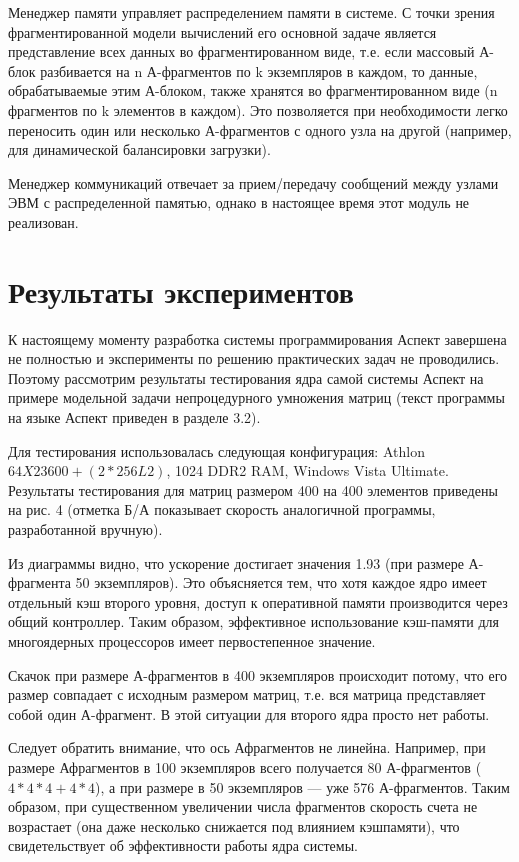 \documentclass[a4paper,11pt,draft]{article} %
\begin{document}
	Менеджер памяти управляет распределением памяти в системе. С точки зрения фрагментированной модели вычислений его основной задаче является представление всех данных во фрагментированном виде, т.е. если массовый А-блок разбивается на n А-фрагментов по k экземпляров
	в каждом, то данные, обрабатываемые этим А-блоком, также хранятся во фрагментированном
	виде (n фрагментов по k элементов в каждом). Это позволяется при необходимости легко переносить один или несколько А-фрагментов с одного узла на другой (например, для динамической
	балансировки загрузки).
	
	Менеджер коммуникаций отвечает за прием/передачу сообщений между узлами ЭВМ с распределенной памятью, однако в настоящее время этот модуль не реализован.
	
	\section{Результаты экспериментов}
	К настоящему моменту разработка системы программирования Аспект завершена не полностью
	и эксперименты по решению практических задач не проводились. Поэтому рассмотрим результаты тестирования ядра самой системы Аспект на примере модельной задачи непроцедурного
	умножения матриц (текст программы на языке Аспект приведен в разделе 3.2).
	
	Для тестирования использовалась следующая конфигурация: Athlon $64 X2 3600+ (2*256 L2)$,
	1024 DDR2 RAM, Windows Vista Ultimate. Результаты тестирования для матриц размером 400 на
	400 элементов приведены на рис. 4 (отметка Б/А показывает скорость аналогичной программы,
	разработанной вручную).
	
	Из диаграммы видно, что ускорение достигает значения 1.93 (при размере А-фрагмента 50
	экземпляров). Это объясняется тем, что хотя каждое ядро имеет отдельный кэш второго уровня,
	доступ к оперативной памяти производится через общий контроллер. Таким образом, эффективное использование кэш-памяти для многоядерных процессоров имеет первостепенное \mbox{значение.}
	
	Скачок при размере А-фрагментов в 400 экземпляров происходит потому, что его размер
	совпадает с исходным размером матриц, т.е. вся матрица представляет собой один А-фрагмент.
	В этой ситуации для второго ядра просто нет работы.
	
	Следует обратить внимание, что ось А\-фрагментов не линейна. Например, при размере А\-фрагментов в 100 экземпляров всего получается 80 А-фрагментов ($4*4*4 + 4*4$), а при размере
	в 50 экземпляров --- уже 576 А-фрагментов. Таким образом, при существенном увеличении числа
	фрагментов скорость счета не возрастает (она даже несколько снижается под влиянием кэш\-памяти), что свидетельствует об эффективности работы ядра системы.
	
\end{document}
